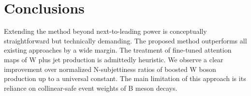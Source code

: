 \section{Conclusions}\label{sec:conclusions}

Extending the method beyond next-to-leading power is conceptually
straightforward but technically demanding. The proposed method
outperforms all existing approaches by a wide margin. The treatment of
fine-tuned attention maps of W plus jet production is admittedly
heuristic. We observe a clear improvement over normalized N-subjettiness
ratios of boosted W boson production up to a universal constant. The
main limitation of this approach is its reliance on collinear-safe event
weights of B meson decays.

